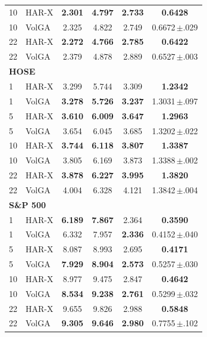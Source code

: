 \begin{tabular}{llcccc}
10 & HAR-X & \textbf{2.301} & \textbf{4.797} & \textbf{2.733} & \textbf{0.6428} \\
10 & VolGA & 2.325 & 4.822 & 2.749 & 0.6672\,$\pm$.029 \\
22 & HAR-X & \textbf{2.272} & \textbf{4.766} & \textbf{2.785} & \textbf{0.6422} \\
22 & VolGA & 2.379 & 4.878 & 2.889 & 0.6527\,$\pm$.003 \\
\midrule
\multicolumn{6}{l}{\textbf{HOSE}} \\
1 & HAR-X & 3.299 & 5.744 & 3.309 & \textbf{1.2342} \\
1 & VolGA & \textbf{3.278} & \textbf{5.726} & \textbf{3.237} & 1.3031\,$\pm$.097 \\
5 & HAR-X & \textbf{3.610} & \textbf{6.009} & \textbf{3.647} & \textbf{1.2963} \\
5 & VolGA & 3.654 & 6.045 & 3.685 & 1.3202\,$\pm$.022 \\
10 & HAR-X & \textbf{3.744} & \textbf{6.118} & \textbf{3.807} & \textbf{1.3387} \\
10 & VolGA & 3.805 & 6.169 & 3.873 & 1.3388\,$\pm$.002 \\
22 & HAR-X & \textbf{3.878} & \textbf{6.227} & \textbf{3.995} & \textbf{1.3820} \\
22 & VolGA & 4.004 & 6.328 & 4.121 & 1.3842\,$\pm$.004 \\
\midrule
\multicolumn{6}{l}{\textbf{S\&P 500}} \\
1 & HAR-X & \textbf{6.189} & \textbf{7.867} & 2.364 & \textbf{0.3590} \\
1 & VolGA & 6.332 & 7.957 & \textbf{2.336} & 0.4152\,$\pm$.040 \\
5 & HAR-X & 8.087 & 8.993 & 2.695 & \textbf{0.4171} \\
5 & VolGA & \textbf{7.929} & \textbf{8.904} & \textbf{2.573} & 0.5257\,$\pm$.030 \\
10 & HAR-X & 8.977 & 9.475 & 2.847 & \textbf{0.4642} \\
10 & VolGA & \textbf{8.534} & \textbf{9.238} & \textbf{2.761} & 0.5299\,$\pm$.032 \\
22 & HAR-X & 9.655 & 9.826 & 2.988 & \textbf{0.5848} \\
22 & VolGA & \textbf{9.305} & \textbf{9.646} & \textbf{2.980} & 0.7755\,$\pm$.102 \\
\bottomrule
\end{tabular}

